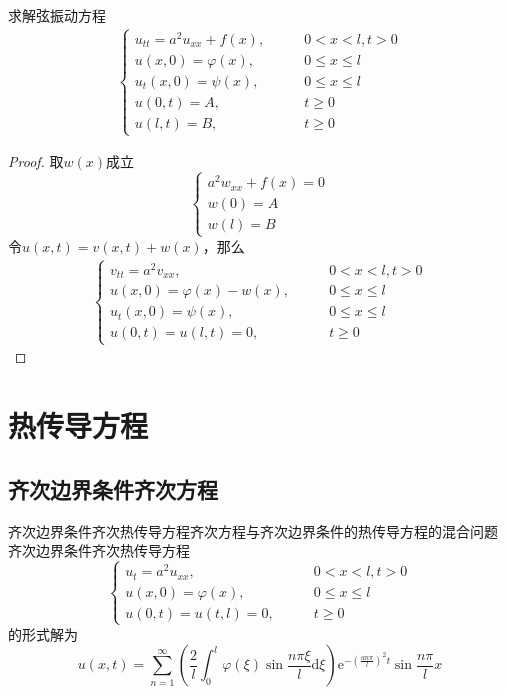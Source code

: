 \documentclass[lang = cn, scheme = chinese, thmcnt = section]{elegantbook}
\newcommand{\dd}{\mathrm{d}}           %
\begin{document}
\begin{theorem}
	求解弦振动方程
	\begin{align*}
		\begin{cases}
			u_{tt}=a^2u_{xx}+f(x),\qquad & 0<x<l,t>0\\
			u(x,0)=\varphi(x),\qquad & 0\le x \le l\\
			u_t(x,0)=\psi(x),\qquad & 0\le x \le l\\
			u(0,t)=A,\qquad & t\ge 0\\
			u(l,t)=B,\qquad & t\ge 0
		\end{cases}
	\end{align*}
\end{theorem}

\begin{proof}
	取$w(x)$成立%
	$$
	\begin{cases}
		a^2w_{xx}+f(x)=0\\
		w(0)=A\\
		w(l)=B
	\end{cases}
	$$
	令$u(x,t)=v(x,t)+w(x)$，那么
	\begin{align*}
		\begin{cases}
			v_{tt}=a^2v_{xx},\qquad & 0<x<l,t>0\\
			u(x,0)=\varphi(x)-w(x),\qquad & 0\le x \le l\\
			u_t(x,0)=\psi(x),\qquad & 0\le x \le l\\
			u(0,t)=u(l,t)=0,\qquad & t\ge 0
		\end{cases}
	\end{align*}
\end{proof}

\section{热传导方程}

\subsection{齐次边界条件齐次方程}

\begin{theorem}{齐次边界条件齐次热传导方程}{齐次方程与齐次边界条件的热传导方程的混合问题}
	齐次边界条件齐次热传导方程
	$$
	\begin{cases}
		u_t=a^2u_{xx},\qquad & 0<x<l,t>0\\
		u(x,0)=\varphi(x),\qquad & 0\le x \le l\\
		u(0,t)=u(t,l)=0,\qquad & t\ge 0
	\end{cases}
	$$
	的形式解为
	$$
	u(x,t)=\sum_{n=1}^{\infty}\left(\frac{2}{l}\int_{0}^{l}\varphi(\xi)\sin\frac{n\pi\xi}{l}\dd \xi\right)\mathrm{e}^{-\left(\frac{an\pi}{l}\right)^2t}\sin\frac{n\pi}{l}x
	$$
\end{theorem}
\end{document}
